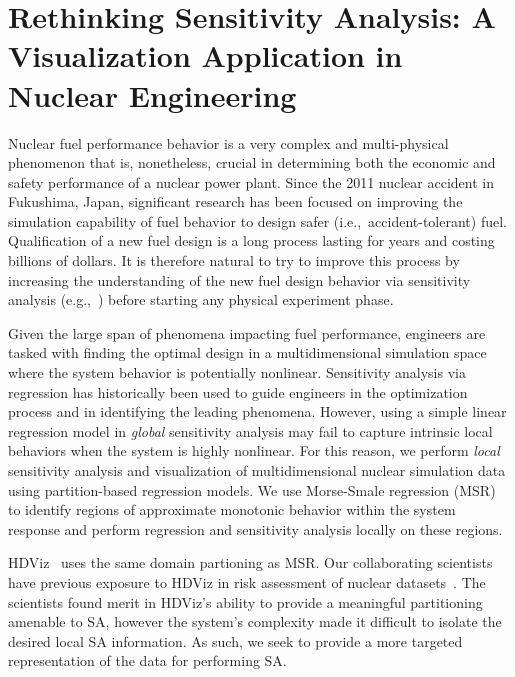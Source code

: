 
\chapter{Rethinking Sensitivity Analysis: A Visualization Application in Nuclear Engineering}
\label{ch:visualization}
Nuclear fuel performance behavior is a very complex and multi-physical phenomenon that is, nonetheless, crucial in determining both the economic and safety performance of a nuclear power plant.
%
Since the 2011 nuclear accident in Fukushima, Japan, significant research has been focused on improving the simulation capability of fuel behavior to design safer (i.e.,\ accident-tolerant) fuel.
%
Qualification of a new fuel design is a long process lasting for years and costing billions of dollars.
%
It is therefore natural to try to improve this process by increasing the understanding of the new fuel design behavior via sensitivity analysis (e.g.,~\cite{IkonenTulkki2014,PastoreSwilerHales2015}) before starting any physical experiment phase.

Given the large span of phenomena impacting fuel performance, engineers are tasked with finding the optimal design in a multidimensional simulation space where the system behavior is potentially nonlinear.
%
Sensitivity analysis via regression has historically been used to guide engineers in the optimization process and in identifying the leading phenomena.
%
However, using a simple linear regression model in \emph{global} sensitivity analysis may fail to capture intrinsic local behaviors when the system is highly nonlinear.
%
For this reason, we perform \emph{local} sensitivity analysis and visualization of multidimensional nuclear simulation data using partition-based regression models.
%
We use Morse-Smale regression (MSR)~\cite{GerberRubelBremer2011} to identify regions of approximate monotonic behavior within the system response and perform regression and sensitivity analysis locally on these regions.

HDViz~\cite{GerberBremerPascucci2010} uses the same domain partioning as MSR.
%
Our collaborating scientists have previous exposure to HDViz in risk assessment of nuclear datasets~\cite{MaljovecWangMandelli2013a,MaljovecWangPascucci2013}.
%
The scientists found merit in HDViz's ability to provide a meaningful partitioning amenable to SA, however the system's complexity made it difficult to isolate the desired local SA information.
%
As such, we seek to provide a more targeted representation of the data for performing SA.

